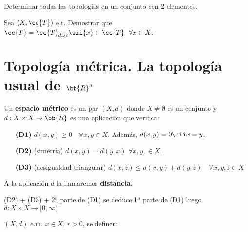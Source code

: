 \begin{ejemplo}
    \begin{ejercicio}
        Determinar todas las topologías en un conjunto con 2 elementos.

    \end{ejercicio}

    \begin{ejercicio}
        Sea $(X, \cc{T})$ e.t. Demostrar que $\cc{T}=\cc{T}_{disc} \sii \{x\}\in \cc{T}\ \  \forall x \in X$. 
    \end{ejercicio}

    \vspace*{0.5cm}

    \section{Topología métrica. La topología usual de $\bb{R}^n$}

    \begin{definicion}
        Un \textbf{espacio métrico} es un par $(X, d)$ donde $X \neq \emptyset$ es un conjunto y $d: X \times X \rightarrow \bb{R}$ es una aplicación que verifica:
    \end{definicion}

    \begin{enumerate}
        \item [\textbf{(\hypertarget{D1}{D1})}] $d(x, y) \geq 0$\ \ $\forall x,y \in X$. Además, $d(x,y)= 0 \sii x=y$.
        \item [\textbf{(\hypertarget{D2}{D2})}] (simetría) $d(x,y)=d(y,x)$ $\forall x, y, \in X.$
        \item [\textbf{(\hypertarget{D3}{D3})}] (desigualdad triangular) $d(x,z) \leq d(x,y) + d(y,z)$\ \ $\forall x,y,z \in X$
    \end{enumerate}

    A la aplicación $d$ la llamaremos \textbf{distancia}.

    \begin{ejercicio}
        (D2) + (D3) + 2ª parte de (D1) se deduce 1ª parte de (D1) luego $d:X \times X \rightarrow [0, \infty)$
    \end{ejercicio}

   \begin{definicion}
        $(X,d)$ e.m. $x \in X$, $r >0$, se definen:


\end{definicion}
\end{ejemplo}
